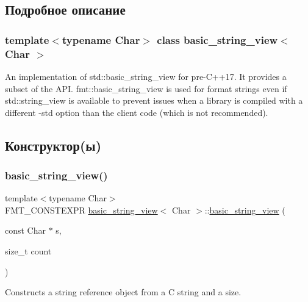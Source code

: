 \subsection{Подробное описание}
\subsubsection*{template$<$typename Char$>$\newline
class basic\+\_\+string\+\_\+view$<$ Char $>$}

An implementation of {\ttfamily std\+::basic\+\_\+string\+\_\+view} for pre-\/\+C++17. It provides a subset of the A\+PI. {\ttfamily fmt\+::basic\+\_\+string\+\_\+view} is used for format strings even if {\ttfamily std\+::string\+\_\+view} is available to prevent issues when a library is compiled with a different {\ttfamily -\/std} option than the client code (which is not recommended). 

\subsection{Конструктор(ы)}
\mbox{\label{classbasic__string__view_a30be409cd941f8fa06e5e7b27496e3dc}} 
\subsubsection{\texorpdfstring{basic\+\_\+string\+\_\+view()}{basic\_string\_view()}\hspace{0.1cm}{\footnotesize\ttfamily [1/3]}}
{\footnotesize\ttfamily template$<$typename Char$>$ \\
F\+M\+T\+\_\+\+C\+O\+N\+S\+T\+E\+X\+PR \hyperlink{classbasic__string__view}{basic\+\_\+string\+\_\+view}$<$ Char $>$\+::\hyperlink{classbasic__string__view}{basic\+\_\+string\+\_\+view} (\begin{DoxyParamCaption}\item[{const Char $\ast$}]{s,  }\item[{size\+\_\+t}]{count }\end{DoxyParamCaption})\hspace{0.3cm}{\ttfamily [inline]}}

Constructs a string reference object from a C string and a size. \mbox{\label{classbasic__string__view_a84823e4cf3eadc6bbe4ecd18e7685ffd}} 
